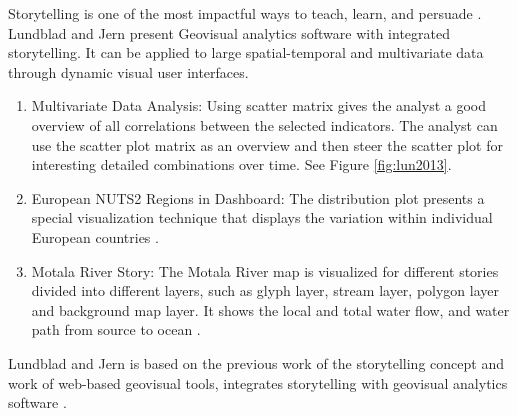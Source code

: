 \documentclass{egpubl}
\begin{document}
Storytelling is one of the most impactful ways to teach, learn, and persuade \cite{lundblad2013}. 
Lundblad and Jern present Geovisual analytics software with integrated storytelling. It can be applied to large spatial-temporal and multivariate data through dynamic visual user interfaces. 
\begin{enumerate}
\item Multivariate Data Analysis: Using scatter matrix gives the analyst a good overview of all correlations between the selected
indicators. The analyst can use the scatter plot matrix as an overview and then steer the scatter plot for interesting detailed combinations over time. See Figure \ref{fig:lun2013}\cite{lundblad2013}.
\item European NUTS2 Regions in Dashboard: The distribution plot presents a special visualization technique that displays the variation within individual European countries \cite{lundblad2013}.
\item Motala River Story: The Motala River map is visualized for different stories divided into different layers, such as glyph layer, stream layer, polygon layer and background map layer. It shows the local and total water flow, and water path from source to ocean \cite{lundblad2013}.
\end{enumerate}
Lundblad and Jern is based on the previous work of the storytelling concept and work of web-based geovisual tools, integrates storytelling with geovisual analytics software \cite{lundblad2013}.
\end{document}
